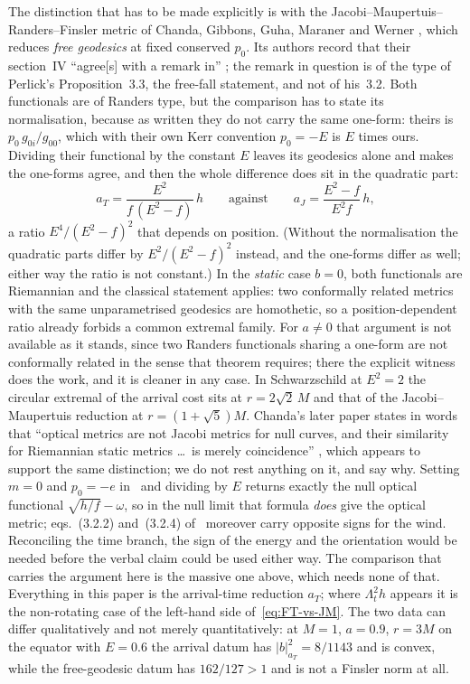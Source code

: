 \documentclass[12pt]{iopart}
\theoremstyle{plain}
\theoremstyle{definition}
\theoremstyle{remark}
\begin{document}
The distinction that has to be made explicitly is with the
Jacobi--Maupertuis--Randers--Finsler metric of Chanda, Gibbons, Guha, Maraner
and Werner \cite[Eq.~(16)]{ChandaEtAl2019}, which reduces \emph{free geodesics}
at fixed conserved $p_0$. Its authors record that their section~IV ``agree[s]
with a remark in'' \cite{Perlick1991} \cite[\S1]{ChandaEtAl2019}; the remark in
question is of the type of Perlick's Proposition~3.3, the free-fall statement,
and not of his~3.2. Both functionals are of Randers type, but the comparison has
to state its normalisation, because as written they do not carry the same
one-form: theirs is $p_0\,g_{0i}/g_{00}$, which with their own Kerr convention
$p_0=-E$ is $E$ times ours. Dividing their functional by the constant $E$ leaves
its geodesics alone and makes the one-forms agree, and then the whole difference
does sit in the quadratic part:
\begin{equation}
    a_T=\frac{E^2}{f\,(E^2-f)}\,h
    \qquad\text{against}\qquad
    a_J=\frac{E^2-f}{E^2f}\,h ,
    \label{eq:FT-vs-JM}
\end{equation}
a ratio $E^4/(E^2-f)^2$ that depends on position. (Without the normalisation the
quadratic parts differ by $E^2/(E^2-f)^2$ instead, and the one-forms differ as
well; either way the ratio is not constant.) In the \emph{static} case
$b=0$, both functionals are Riemannian and the classical statement applies: two
conformally related metrics with the same unparametrised geodesics are
homothetic, so a position-dependent ratio already forbids a common extremal
family. For $a\neq0$ that argument is not available as it stands, since two
Randers functionals sharing a one-form are not conformally related in the sense
that theorem requires; there the explicit witness does the work, and it is
cleaner in any case. In Schwarzschild at $E^2=2$ the circular extremal of
the arrival cost sits at $r=2\sqrt2\,M$ and that of the Jacobi--Maupertuis
reduction at $r=(1+\sqrt5)M$. Chanda's later paper states in words that
``optical metrics are not Jacobi metrics for null curves, and their similarity
for Riemannian static metrics \dots\ is merely coincidence''
\cite[\S3.2]{Chanda2024}, which appears to support the same distinction; we do
not rest anything on it, and say why. Setting $m=0$ and $p_0=-e$
in~\cite[Eq.~(16)]{ChandaEtAl2019} and dividing by $E$ returns exactly the null
optical functional $\sqrt{h/f}-\omega$, so in the null limit that formula
\emph{does} give the optical metric; eqs.~(3.2.2) and~(3.2.4)
of~\cite{Chanda2024} moreover carry opposite signs for the wind. Reconciling the
time branch, the sign of the energy and the orientation would be needed before
the verbal claim could be used either way. The comparison that carries the
argument here is the massive one above, which needs none of that.
Everything in this paper is the
arrival-time reduction $a_T$; where $\Lambda_t^2h$ appears it is the
non-rotating case of the left-hand side of~\eqref{eq:FT-vs-JM}. The two data can
differ qualitatively and not merely quantitatively: at $M=1$, $a=0.9$, $r=3M$ on
the equator with $E=0.6$ the arrival datum has $|b|^2_{a_T}=8/1143$ and is
convex, while the free-geodesic datum has $162/127>1$ and is not a Finsler norm
at all.
\end{document}
